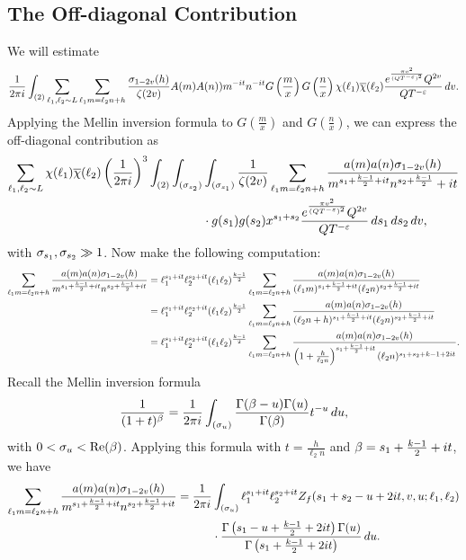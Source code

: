 \documentclass[12pt,reqno,oneside]{amsart}
\begin{document}
  \subsection*{The Off-diagonal Contribution}
    We will estimate
    \[
      \frac{1}{2\pi i}\int_{(2)}\sum_{\ell_{1},\ell_{2} \sim L}\sum_{\ell_{1}m = \ell_{2}n+h}\frac{\sigma_{1-2v}(h)}{\zeta(2v)}A(m)A(n))m^{-it}n^{-it}G\left(\frac{m}{x}\right)G\left(\frac{n}{x}\right)\chi(\ell_{1})\overline{\chi}(\ell_{2})\frac{e^{\frac{\pi v^{2}}{(QT^{-\varepsilon})^{2}}}Q^{2v}}{QT^{-\varepsilon}}\,dv.
    \]
    Applying the Mellin inversion formula to $G\left(\frac{m}{x}\right)$ and $G\left(\frac{n}{x}\right)$, we can express the off-diagonal contribution as
    \begin{align*}
      \sum_{\ell_{1},\ell_{2} \sim L}\chi(\ell_{1})\overline{\chi}(\ell_{2})\left(\frac{1}{2\pi i}\right)^{3}\int_{(2)}\int_{(\sigma_{s_{2}})}&\int_{(\sigma_{s_{1}})}\frac{1}{\zeta(2v)}\sum_{\ell_{1}m = \ell_{2}n+h}\frac{a(m)a(n)\sigma_{1-2v}(h)}{m^{s_{1}+\frac{k-1}{2}+it}n^{s_{2}+\frac{k-1}{2}}+it} \\
      &\cdot g(s_{1})g(s_{2})x^{s_{1}+s_{2}}\frac{e^{\frac{\pi v^{2}}{(QT^{-\varepsilon})^{2}}}Q^{2v}}{QT^{-\varepsilon}}\,ds_{1}\,ds_{2}\,dv,
    \end{align*}
    with $\sigma_{s_{1}},\sigma_{s_{2}} \gg 1$. Now make the following computation:
    \begin{align*}
      \sum_{\ell_{1}m = \ell_{2}n+h}\frac{a(m)a(n)\sigma_{1-2v}(h)}{m^{s_{1}+\frac{k-1}{2}+it}n^{s_{2}+\frac{k-1}{2}+it}} &= \ell_{1}^{s_{1}+it}\ell_{2}^{s_{2}+it}(\ell_{1}\ell_{2})^{\frac{k-1}{2}}\sum_{\ell_{1}m = \ell_{2}n+h}\frac{a(m)a(n)\sigma_{1-2v}(h)}{(\ell_{1}m)^{s_{1}+\frac{k-1}{2}+it}(\ell_{2}n)^{s_{2}+\frac{k-1}{2}+it}} \\
      &= \ell_{1}^{s_{1}+it}\ell_{2}^{s_{2}+it}(\ell_{1}\ell_{2})^{\frac{k-1}{2}}\sum_{\ell_{1}m = \ell_{2}n+h}\frac{a(m)a(n)\sigma_{1-2v}(h)}{(\ell_{2}n+h)^{s_{1}+\frac{k-1}{2}+it}(\ell_{2}n)^{s_{2}+\frac{k-1}{2}+it}} \\
      &= \ell_{1}^{s_{1}+it}\ell_{2}^{s_{2}+it}(\ell_{1}\ell_{2})^{\frac{k-1}{2}}\sum_{\ell_{1}m = \ell_{2}n+h}\frac{a(m)a(n)\sigma_{1-2v}(h)}{\left(1+\frac{h}{\ell_{2}n}\right)^{s_{1}+\frac{k-1}{2}+it}(\ell_{2}n)^{s_{1}+s_{2}+k-1+2it}}.
    \end{align*}
    Recall the Mellin inversion formula
    \[
      \frac{1}{(1+t)^{\beta}} = \frac{1}{2\pi i}\int_{(\sigma_{u})}\frac{\Gamma(\beta-u)\Gamma(u)}{\Gamma(\beta)}t^{-u}\,du,
    \]
    with $0 < \sigma_{u} < \mathrm{Re}(\beta)$. Applying this formula with $t = \frac{h}{\ell_{2}n}$ and $\beta = s_{1}+\frac{k-1}{2}+it$, we have
    \begin{align*}
      \sum_{\ell_{1}m = \ell_{2}n+h}\frac{a(m)a(n)\sigma_{1-2v}(h)}{m^{s_{1}+\frac{k-1}{2}+it}n^{s_{2}+\frac{k-1}{2}+it}} = \frac{1}{2\pi i}&\int_{(\sigma_{u})}\ell_{1}^{s_{1}+it}\ell_{2}^{s_{2}+it}Z_{f}(s_{1}+s_{2}-u+2it,v,u;\ell_{1},\ell_{2}) \\
      &\cdot \frac{\Gamma\left(s_{1}-u+\frac{k-1}{2}+2it\right)\Gamma(u)}{\Gamma\left(s_{1}+\frac{k-1}{2}+2it\right)}\,du.
    \end{align*}
\end{document}
